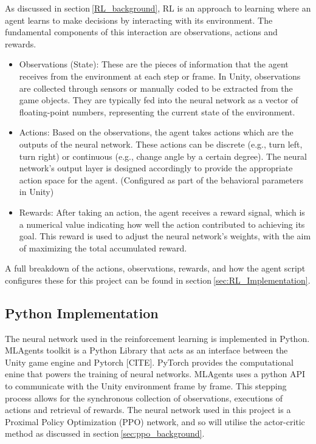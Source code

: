 As discussed in section$~$\ref{RL_background}, RL is an approach to learning where an agent learns to make decisions by interacting with its environment. The fundamental components of this interaction are observations, actions and rewards.
\begin{itemize}
    \item Observations (State): These are the pieces of information that the agent receives from the environment at each step or frame. In Unity, observations are collected through sensors or manually coded to be extracted from the game objects. They are typically fed into the neural network as a vector of floating-point numbers, representing the current state of the environment.
    \item Actions: Based on the observations, the agent takes actions which are the outputs of the neural network. These actions can be discrete (e.g., turn left, turn right) or continuous (e.g., change angle by a certain degree). The neural network's output layer is designed accordingly to provide the appropriate action space for the agent. (Configured as part of the behavioral parameters in Unity)
    \item Rewards: After taking an action, the agent receives a reward signal, which is a numerical value indicating how well the action contributed to achieving its goal. This reward is used to adjust the neural network's weights, with the aim of maximizing the total accumulated reward.
\end{itemize}
A full breakdown of the actions, observations, rewards, and how the agent script configures these for this project can be found in section$~$\ref{sec:RL_Implementation}.


\subsection{Python Implementation}
The neural network used in the reinforcement learning is implemented in Python. MLAgents toolkit is a Python Library that acts as an interface between the Unity game engine and Pytorch [CITE]. PyTorch provides the computational enine that powers the training of neural networks. MLAgents uses a python API to communicate with the Unity environment frame by frame. This stepping process allows for the synchronous collection of observations, executions of actions and retrieval of rewards. The neural network used in this project is a Proximal Policy Optimization (PPO) network, and so will utilise the actor-critic method as discussed in section$~$\ref{sec:ppo_background}.

